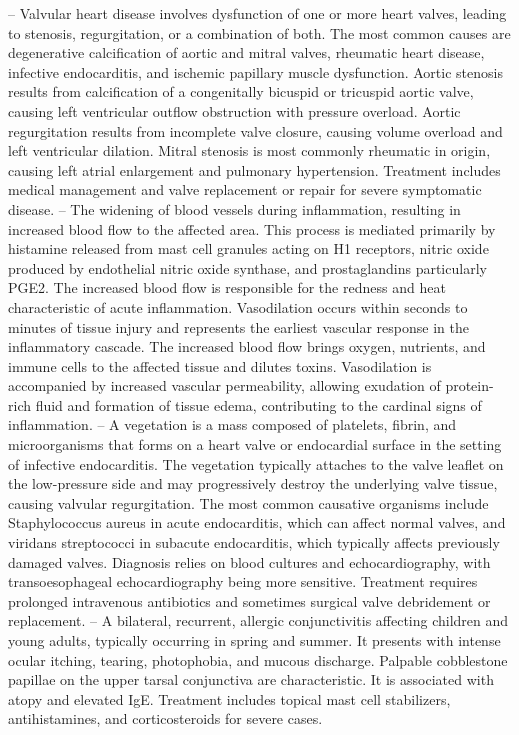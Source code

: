 -- Valvular heart disease involves dysfunction of one or more heart valves, leading to stenosis, regurgitation, or a combination of both. The most common causes are degenerative calcification of aortic and mitral valves, rheumatic heart disease, infective endocarditis, and ischemic papillary muscle dysfunction. Aortic stenosis results from calcification of a congenitally bicuspid or tricuspid aortic valve, causing left ventricular outflow obstruction with pressure overload. Aortic regurgitation results from incomplete valve closure, causing volume overload and left ventricular dilation. Mitral stenosis is most commonly rheumatic in origin, causing left atrial enlargement and pulmonary hypertension. Treatment includes medical management and valve replacement or repair for severe symptomatic disease.
-- The widening of blood vessels during inflammation, resulting in increased blood flow to the affected area. This process is mediated primarily by histamine released from mast cell granules acting on H1 receptors, nitric oxide produced by endothelial nitric oxide synthase, and prostaglandins particularly PGE2. The increased blood flow is responsible for the redness and heat characteristic of acute inflammation. Vasodilation occurs within seconds to minutes of tissue injury and represents the earliest vascular response in the inflammatory cascade. The increased blood flow brings oxygen, nutrients, and immune cells to the affected tissue and dilutes toxins. Vasodilation is accompanied by increased vascular permeability, allowing exudation of protein-rich fluid and formation of tissue edema, contributing to the cardinal signs of inflammation.
-- A vegetation is a mass composed of platelets, fibrin, and microorganisms that forms on a heart valve or endocardial surface in the setting of infective endocarditis. The vegetation typically attaches to the valve leaflet on the low-pressure side and may progressively destroy the underlying valve tissue, causing valvular regurgitation. The most common causative organisms include Staphylococcus aureus in acute endocarditis, which can affect normal valves, and viridans streptococci in subacute endocarditis, which typically affects previously damaged valves. Diagnosis relies on blood cultures and echocardiography, with transoesophageal echocardiography being more sensitive. Treatment requires prolonged intravenous antibiotics and sometimes surgical valve debridement or replacement.
-- A bilateral, recurrent, allergic conjunctivitis affecting children and young adults, typically occurring in spring and summer. It presents with intense ocular itching, tearing, photophobia, and mucous discharge. Palpable cobblestone papillae on the upper tarsal conjunctiva are characteristic. It is associated with atopy and elevated IgE. Treatment includes topical mast cell stabilizers, antihistamines, and corticosteroids for severe cases.
